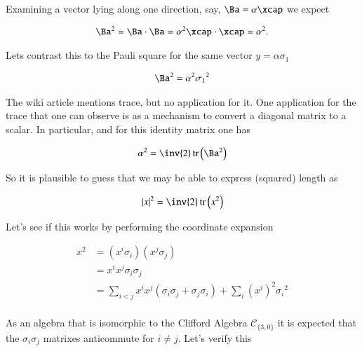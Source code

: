 \documentclass{article}
\newcommand{\Clifford}[2]{\mathcal{C}_{\{{#1},{#2}\}}}
\DeclareMathOperator{\tr}{tr}
\newcommand{\trace}[1]{\tr\left({#1}\right)}
\begin{document}
Examining a vector lying along one direction, say, $\Ba = \alpha\xcap$ we expect

\begin{align*}
\Ba^2 = \Ba \cdot \Ba = \alpha^2 \xcap \cdot \xcap = \alpha^2.
\end{align*}

Lets contrast this to the Pauli square for the same vector $y = \alpha\sigma_1$

\begin{align*}
\Ba^2 = \alpha^2 {\sigma_1}^2
\end{align*}

The wiki article mentions trace, but no application for it.  One application for the trace that one can observe is as a mechanism to convert a diagonal
matrix to a scalar.
In particular, and for this identity matrix one has

\begin{align*}
\alpha^2 = \inv{2} \trace{\Ba^2}
\end{align*}

So it is plausible to guess that we may be able to express (squared) length as

\begin{align*}
\Abs{x}^2 = \inv{2}\trace{x^2}
\end{align*}

Let's see if this works by performing the coordinate expansion

\begin{align*}
x^2
&= (x^i \sigma_i)(x^j \sigma_j) \\
&= x^i x^j \sigma_i \sigma_j \\
&= \sum_{i < j} x^i x^j (\sigma_i \sigma_j + \sigma_j \sigma_i) + \sum_i (x^i)^2 {\sigma_i}^2 \\
\end{align*}

As an algebra that is isomorphic to the Clifford Algebra $\Clifford{3}{0}$ it is expected that the $\sigma_i \sigma_j$ matrixes anticommute for $i \ne j$.  Let's verify this
\end{document}
